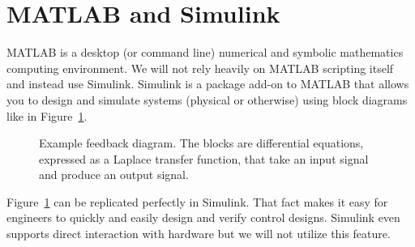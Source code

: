 \section{MATLAB and Simulink}
MATLAB is a desktop (or command line) numerical and symbolic
mathematics computing environment. We will not rely heavily on MATLAB
scripting itself and instead use Simulink. Simulink is a
package add-on to MATLAB that allows you to design and simulate
systems (physical or otherwise) using block diagrams like in
Figure~\ref{fig:intro:1}.
%
\begin{figure}
  \centering
  \caption{
    Example feedback diagram. The blocks are differential equations, expressed
    as a Laplace transfer function, that take an input signal and produce an
    output signal.
  }
  \label{fig:intro:1}
\end{figure}
%
Figure~\ref{fig:intro:1} can be replicated perfectly in Simulink.
That fact makes it easy for engineers to quickly and easily design and verify
control designs. Simulink even supports direct interaction with
hardware but we will not utilize this feature.

